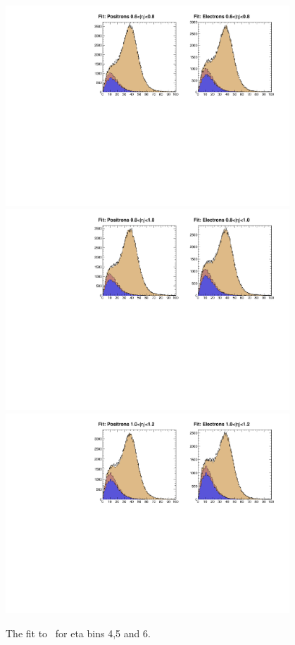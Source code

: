 
\begin{figure}
  \begin{center}
\includegraphics[width=0.95\textwidth]{data_3.pdf} \\
\includegraphics[width=0.95\textwidth]{data_4.pdf} \\
\includegraphics[width=0.95\textwidth]{data_5.pdf}
 \caption{  \label{fig:data2} The fit to \MET\ for eta bins 4,5 and 6.}
  \end{center}
\end{figure}

